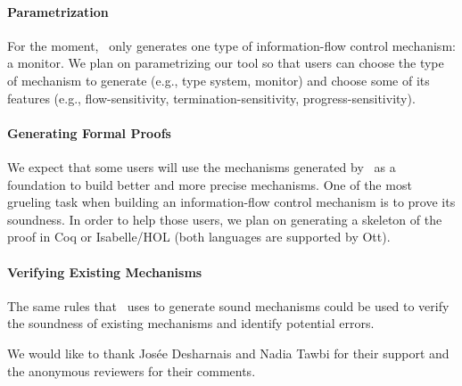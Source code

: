 \documentclass[sigplan,10pt]{acmart}\settopmatter{printfolios=true,printccs=false,printacmref=false}
\begin{document}
\paragraph{Parametrization} For the moment, \ottifc\ only generates one type of information-flow control mechanism: a monitor. We plan on parametrizing our tool so that users can choose the type of mechanism to generate (e.g., type system, monitor) and choose some of its features (e.g., flow-sensitivity, termination-sensitivity, progress-sensitivity).

\paragraph{Generating Formal Proofs} We expect that some users will use the mechanisms generated by \ottifc\ as a foundation to build better and more precise mechanisms. One of the most grueling task when building an information-flow control mechanism is to prove its soundness. In order to help those users, we plan on generating a skeleton of the proof in Coq or Isabelle/HOL (both languages are supported by Ott).

\paragraph{Verifying Existing Mechanisms} The same rules that \ottifc\ uses to generate sound mechanisms could be used to verify the soundness of existing mechanisms and identify potential errors.

\begin{acks}
We would like to thank Josée Desharnais and Nadia Tawbi for their support and the anonymous reviewers for their comments.
\end{acks}


\end{document}
